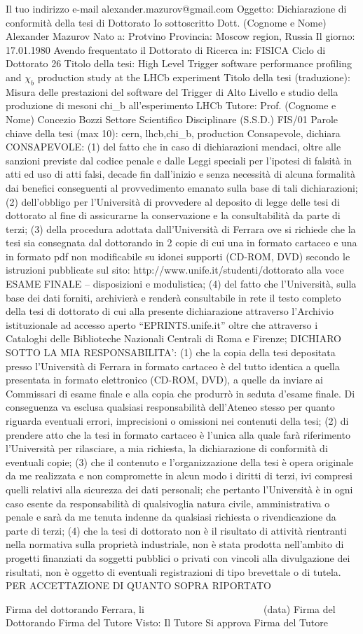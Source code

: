 Il tuo indirizzo e-mail
alexander.mazurov@gmail.com
Oggetto:
Dichiarazione di conformità della tesi di Dottorato
Io sottoscritto Dott. (Cognome e Nome)
Alexander Mazurov
Nato a:
Protvino
Provincia:
Moscow region, Russia
Il giorno:
17.01.1980
Avendo frequentato il Dottorato di Ricerca in:
FISICA
Ciclo di Dottorato
26
Titolo della tesi:
High Level Trigger software performance profiling and $\chi_b$ production study at the LHCb experiment
Titolo della tesi (traduzione):
Misura delle prestazioni del software del Trigger di Alto Livello e studio della produzione di mesoni chi_b all'esperimento LHCb
Tutore: Prof. (Cognome e Nome)
Concezio Bozzi
Settore Scientifico Disciplinare (S.S.D.)
FIS/01
Parole chiave della tesi (max 10):
cern, lhcb,chi\_b, production
Consapevole, dichiara
CONSAPEVOLE: (1) del fatto che in caso di dichiarazioni mendaci, oltre alle sanzioni previste dal codice penale e dalle Leggi speciali per l’ipotesi di falsità in atti ed uso di atti falsi, decade fin dall’inizio e senza necessità di alcuna formalità dai benefici conseguenti al provvedimento emanato sulla base di tali dichiarazioni; (2) dell’obbligo per l’Università di provvedere al deposito di legge delle tesi di dottorato al fine di assicurarne la conservazione e la consultabilità da parte di terzi; (3) della procedura adottata dall’Università di Ferrara ove si richiede che la tesi sia consegnata dal dottorando in 2 copie di cui una in formato cartaceo e una in formato pdf non modificabile su idonei supporti (CD-ROM, DVD) secondo le istruzioni pubblicate sul sito: http://www.unife.it/studenti/dottorato alla voce ESAME FINALE – disposizioni e modulistica; (4) del fatto che l’Università, sulla base dei dati forniti, archivierà e renderà consultabile in rete il testo completo della tesi di dottorato di cui alla presente dichiarazione attraverso l’Archivio istituzionale ad accesso aperto “EPRINTS.unife.it” oltre che attraverso i Cataloghi delle Biblioteche Nazionali Centrali di Roma e Firenze; DICHIARO SOTTO LA MIA RESPONSABILITA': (1) che la copia della tesi depositata presso l’Università di Ferrara in formato cartaceo è del tutto identica a quella presentata in formato elettronico (CD-ROM, DVD), a quelle da inviare ai Commissari di esame finale e alla copia che produrrò in seduta d’esame finale. Di conseguenza va esclusa qualsiasi responsabilità dell’Ateneo stesso per quanto riguarda eventuali errori, imprecisioni o omissioni nei contenuti della tesi; (2) di prendere atto che la tesi in formato cartaceo è l’unica alla quale farà riferimento l’Università per rilasciare, a mia richiesta, la dichiarazione di conformità di eventuali copie; (3) che il contenuto e l’organizzazione della tesi è opera originale da me realizzata e non compromette in alcun modo i diritti di terzi, ivi compresi quelli relativi alla sicurezza dei dati personali; che pertanto l’Università è in ogni caso esente da responsabilità di qualsivoglia natura civile, amministrativa o penale e sarà da me tenuta indenne da qualsiasi richiesta o rivendicazione da parte di terzi; (4) che la tesi di dottorato non è il risultato di attività rientranti nella normativa sulla proprietà industriale, non è stata prodotta nell’ambito di progetti finanziati da soggetti pubblici o privati con vincoli alla divulgazione dei risultati, non è oggetto di eventuali registrazioni di tipo brevettale o di tutela. PER ACCETTAZIONE DI QUANTO SOPRA RIPORTATO

Firma del dottorando
Ferrara, li ~~~~~~~~~~~~~~~~~~~~~~~ (data) 
Firma del Dottorando 
Firma del Tutore
Visto: Il Tutore Si approva Firma del Tutore
